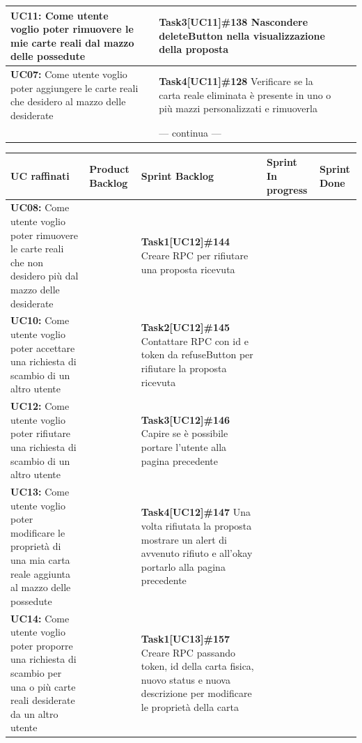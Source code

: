 \documentclass[a4paper, oneside]{article}
\begin{document}
\begin{landscape}
\begin{tabular}{ | p{6.5cm} | p{3cm} | p{8cm} | p{2.9cm} | p{2.4cm}| }
            \textbf{UC11:}  Come utente voglio poter rimuovere le mie carte reali dal mazzo delle possedute  & & \textbf{Task3[UC11]\#138} Nascondere deleteButton nella visualizzazione della proposta  & & \\ \hline
            \textbf{UC07:}  Come utente voglio poter aggiungere le carte reali che desidero al mazzo delle desiderate   & & \textbf{Task4[UC11]\#128} Verificare se la carta reale eliminata è presente in uno o più mazzi personalizzati e rimuoverla  & & \\ \hline
            & & --- continua --- & & \\
            \hline
        \end{tabular}
        \newpage
        \small
        \noindent
        \def\arraystretch{2}%
        \begin{tabular}{ | p{6.5cm} | p{3cm} | p{8cm} | p{2.9cm} | p{2.4cm}| }
            \hline
            \textbf{UC raffinati}
            & \textbf{Product Backlog}
            & \textbf{Sprint Backlog}
            & \textbf{Sprint In progress}
            & \textbf{Sprint Done} \\
            \hline
            \hline
            \textbf{UC08:}  Come utente voglio poter rimuovere le carte reali che non desidero più dal mazzo delle desiderate  & & \textbf{Task1[UC12]\#144} Creare RPC per rifiutare una proposta ricevuta  & & \\ \hline
            \textbf{UC10:}  Come utente voglio poter accettare una richiesta di scambio di un altro utente  & & \textbf{Task2[UC12]\#145} Contattare RPC con id e token da refuseButton per rifiutare la proposta ricevuta  & & \\ \hline
            \textbf{UC12:}  Come utente voglio poter rifiutare una richiesta di scambio di un altro utente  & & \textbf{Task3[UC12]\#146} Capire se è possibile portare l'utente alla pagina precedente  & & \\ \hline
            \textbf{UC13:}  Come utente voglio poter modificare le proprietà di una mia carta reale aggiunta al mazzo delle possedute  & & \textbf{Task4[UC12]\#147} Una volta rifiutata la proposta mostrare un alert di avvenuto rifiuto e all'okay portarlo alla pagina precedente  & & \\ \hline
            \textbf{UC14:}  Come utente voglio poter proporre una richiesta di scambio per una o più carte reali desiderate da un altro utente   & & \textbf{Task1[UC13]\#157} Creare RPC passando token, id della carta fisica, nuovo status e nuova descrizione per modificare le proprietà della carta  & & \\ \hline

\end{tabular}
\end{landscape}
\end{document}
